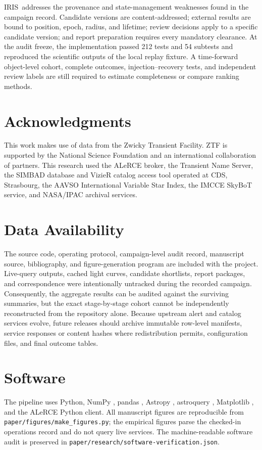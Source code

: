 \documentclass[11pt]{article}
\newcommand{\iris}{IRIS}
\begin{document}
\iris\ addresses the provenance and state-management weaknesses found in the campaign record. Candidate versions are content-addressed; external results are bound to position, epoch, radius, and lifetime; review decisions apply to a specific candidate version; and report preparation requires every mandatory clearance. At the audit freeze, the implementation passed 212 tests and 54 subtests and reproduced the scientific outputs of the local replay fixture. A time-forward object-level cohort, complete outcomes, injection--recovery tests, and independent review labels are still required to estimate completeness or compare ranking methods.

\section*{Acknowledgments}

This work makes use of data from the Zwicky Transient Facility. ZTF is supported by the National Science Foundation and an international collaboration of partners. This research used the ALeRCE broker, the Transient Name Server, the SIMBAD database and VizieR catalog access tool operated at CDS, Strasbourg, the AAVSO International Variable Star Index, the IMCCE SkyBoT service, and NASA/IPAC archival services.

\section*{Data Availability}

The source code, operating protocol, campaign-level audit record, manuscript source, bibliography, and figure-generation program are included with the project. Live-query outputs, cached light curves, candidate shortlists, report packages, and correspondence were intentionally untracked during the recorded campaign. Consequently, the aggregate results can be audited against the surviving summaries, but the exact stage-by-stage cohort cannot be independently reconstructed from the repository alone. Because upstream alert and catalog services evolve, future releases should archive immutable row-level manifests, service responses or content hashes where redistribution permits, configuration files, and final outcome tables.

\section*{Software}

The pipeline uses Python, NumPy \citep{harris2020}, pandas \citep{mckinney2010}, Astropy \citep{astropy2013,astropy2018}, astroquery \citep{ginsburg2019}, Matplotlib \citep{hunter2007}, and the ALeRCE Python client. All manuscript figures are reproducible from \texttt{paper/figures/make\_figures.py}; the empirical figures parse the checked-in operations record and do not query live services. The machine-readable software audit is preserved in \texttt{paper/research/software-verification.json}.
\end{document}
